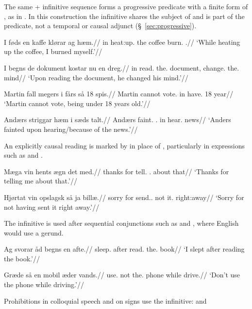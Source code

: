 The same  + infinitive sequence forms a progressive predicate with a finite form of , as in . In this construction the infinitive shares the subject of  and is part of the predicate, not a temporal or causal adjunct (\S~\ref{sec:progressive}).

\pex
\begingl
\gla I føds en kaffe klørar ag hæm.//
\glb in heat:up.\Inf{} the coffee burn.\Pst{} \First{}\Sg{} \Refl{}.\Acc{}//
\glft `While heating up the coffee, I burned myself.'//
\endgl
\xe

\pex
\begingl
\gla I begns de dokument kostar nu en dreg.//
\glb in read.\Inf{} the.\F{} document, change.\Pst{} \Third{}\Sg{} the.\M{} mind//
\glft `Upon reading the document, he changed his mind.'//
\endgl
\xe

\pex
\begingl
\gla Martin fall megers i fårs så 18 spis.//
\glb Martin cannot vote.\Inf{} in have.\Inf{} \Neg{} 18 year//
\glft `Martin cannot vote, being under 18 years old.'//
\endgl
\xe

\pex
\begingl
\gla Andærs striggar hæm i sæds talt.//
\glb Andærs faint.\Pst{} \Refl{}.\Acc{} in hear.\Inf{} news//
\glft `Anders fainted upon hearing/because of the news.'//
\endgl
\xe

An explicitly causal reading is marked by  in place of , particularly in expressions such as  and .

\pex
\begingl
\gla Mæga vin hents ægn det med.//
\glb thanks for tell.\Inf{} \First{}\Sg{}.\Acc{} about that//
\glft `Thanks for telling me about that.'//
\endgl
\xe


\pex
\begingl
\gla Hjørtat vin opslagsk så ja billæ.//
\glb sorry for send.\Perf.\Inf{} not it.\Acc{} right:away//
\glft `Sorry for not having sent it right away.'//
\endgl
\xe

The infinitive is used after sequential conjunctions such as  and , where English would use a gerund.

\pex
\begingl
\gla Ag svorar åd begns en afte.//
\glb \First{}\Sg{} sleep.\Pst{} after read.\Inf{} the.\M{} book//
\glft `I slept after reading the book.'//
\endgl
\xe

\pex
\begingl
\gla Græde så en mobil æder vands.//
\glb use.\Imp{} not the.\M{} phone while drive.\Inf{}//
\glft `Don't use the phone while driving.'//
\endgl
\xe

Prohibitions in colloquial speech and on signs use the infinitive:  and 

